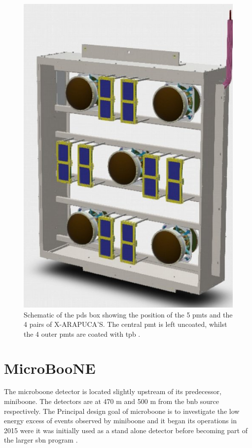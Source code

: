 \begin{figure}[!h]
    \centering
    \includegraphics[width = \largefigwidth]{figures-chap3/PDS_box.jpg}
    \caption[Schematic of PDS box.]{Schematic of the \gls{pds} box showing the position of the 5 \glspl{pmt} and the 4 pairs of X-ARAPUCA'S. The central \gls{pmt} is left uncoated, whilst the 4 outer \glspl{pmt} are coated with \gls{tpb} \cite{LArTPC_review}.}
    \label{fig:pds_box}
\end{figure}

\section{MicroBooNE}\label{sec:MicroBooNE}

The \gls{microboone} detector is located slightly upstream of its predecessor, \gls{miniboone}. The detectors are at 470 m and 500 m from the \gls{bnb} source respectively. The Principal design goal of \gls{microboone} is to investigate the low energy excess of events observed by \gls{miniboone} and it began its operations in 2015 were it was initially used as a stand alone detector before becoming part of the larger \gls{sbn} program \cite{microboone_detector}.

